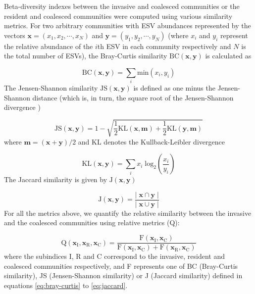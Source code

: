 \documentclass[a4paper,10pt]{article}
\begin{document}
Beta-diversity indexes between the invasive and coalesced communities
or the resident and coalesced communities were computed using various
similarity metrics. For two arbitrary communities with
ESV abundances represented by the vectors
$\mathbf{x} = \left( x_1, x_2, \cdots, x_N \right)$
and
$\mathbf{y} = \left( y_1, y_2, \cdots, y_N \right)$
(where $x_i$ and $y_i$ represent the relative abundance of the $i$th ESV in
each community respectively and $N$ is the total number of ESVs), the Bray-Curtis
similarity $\mathrm{BC} \left( \mathbf{x}, \mathbf{y} \right)$ is calculated as
\cite{Bray1957}

\begin{equation}
\mathrm{BC} \left( \mathbf{x}, \mathbf{y} \right) = 
\sum_i \mathrm{min} \left( x_i , y_i \right)
\label{eq:bray-curtis}
\end{equation}
%
The Jensen-Shannon similarity
$\mathrm{JS} \left( \mathbf{x}, \mathbf{y} \right)$
is defined as one minus the Jensen-Shannon distance (which is, in turn,
the square root of the Jensen-Shannon divergence \cite{Lin1991})

\begin{equation}
\mathrm{JS} \left( \mathbf{x}, \mathbf{y} \right) = 
1 - \sqrt{\frac{1}{2}\mathrm{KL} \left( \mathbf{x}, \mathbf{m} \right) +
\frac{1}{2}\mathrm{KL} \left( \mathbf{y}, \mathbf{m} \right)}
\label{eq:jensen-shannon}
\end{equation}
%
where $\mathbf{m} = \left( \mathbf{x} + \mathbf{y} \right)/2$ and KL denotes the
Kullback-Leibler divergence \cite{Kullback1951}

\begin{equation}
\mathrm{KL} \left( \mathbf{x}, \mathbf{y} \right) = 
\sum_i x_i \; \mathrm{log_2} \left( \frac{x_i}{y_i} \right)
\label{eq:kullback-leibler}
\end{equation}
%
The Jaccard similarity is given by
$\mathrm{J} \left( \mathbf{x}, \mathbf{y} \right)$ \cite{Jaccard1912}

\begin{equation}
\mathrm{J} \left( \mathbf{x}, \mathbf{y} \right) = 
\frac{\left|\; \mathbf{x} \cap \mathbf{y} \;\right|}
{\left|\; \mathbf{x} \cup \mathbf{y} \;\right|}
\label{eq:jaccard}
\end{equation}
%
For all the metrics above, we quantify the relative similarity between the invasive
and the coalesced communities using relative metrics (Q):

\begin{equation}
\mathrm{Q} \left( \mathbf{x}_\mathrm{I},
\mathbf{x}_\mathrm{R},
\mathbf{x}_\mathrm{C} \right) = 
\frac{\mathrm{F} \left( \mathbf{x}_\mathrm{I},\mathbf{x}_\mathrm{C}\right)}
{\mathrm{F} \left( \mathbf{x}_\mathrm{I},\mathbf{x}_\mathrm{C}\right)
+
\mathrm{F} \left( \mathbf{x}_\mathrm{R},\mathbf{x}_\mathrm{C}\right)}
\label{eq:q}
\end{equation}
%
where the subindices I, R and C correspond to the invasive, resident and coalesced
communities respectively, and F represents one of BC (Bray-Curtis similarity), JS
(Jensen-Shannon similarity) or J (Jaccard similarity) defined in equations
\ref{eq:bray-curtis} to \ref{eq:jaccard}.
\end{document}
